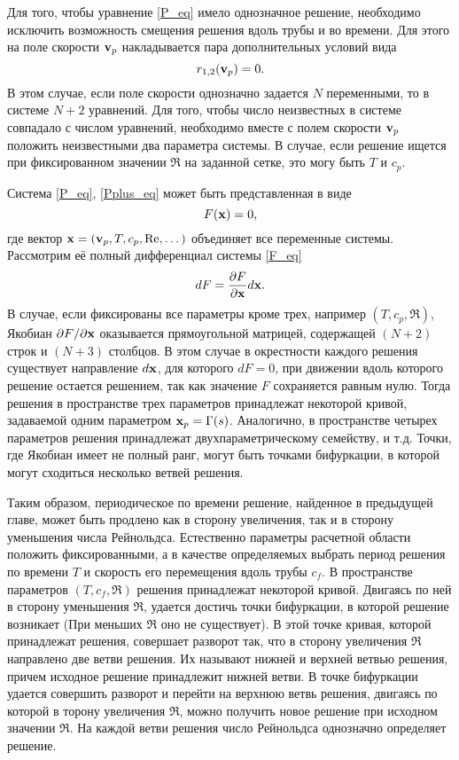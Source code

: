 Для того, чтобы уравнение \eqref{P_eq} имело однозначное решение, необходимо исключить возможность смещения решения вдоль трубы и во времени. Для этого на поле скорости $\mathbf{v}_p$ накладывается пара дополнительных условий вида 
\begin{equation}\label{Pplus_eq}
r_{1,2}(\mathbf{v}_p) = 0.
\end{equation}
В этом случае, если поле скорости однозначно задается $N$ переменными, то в системе $N+2$ уравнений. Для того, чтобы число неизвестных в системе совпадало с числом уравнений, необходимо вместе с полем скорости $\mathbf{v}_p$ положить неизвестными два параметра системы. В случае, если решение ищется при фиксированном значении $\Re$ на заданной сетке, это могу быть $T$ и $c_p$. 

Система \eqref{P_eq}, \eqref{Pplus_eq} может быть представленная в виде 
\begin{equation}\label{F_eq}
F(\mathbf{x}) = 0, 
\end{equation}
где вектор $\mathbf{x} = (\mathbf{v}_p, T, c_p, \operatorname{Re}, \dots)$ объединяет все переменные системы. Рассмотрим её полный дифференциал системы \eqref{F_eq}
\begin{equation}\label{dF_eq}
dF = \frac{\partial F}{\partial \mathbf{x}}d\mathbf{x}.
\end{equation}
В случае, если фиксированы все параметры кроме трех, например $(T, c_p, \Re)$, Якобиан ${\partial F}/{\partial \mathbf{x}}$ оказывается прямоугольной матрицей, содержащей $(N+2)$ строк и $(N+3)$ столбцов. В этом случае в окрестности каждого решения существует направление $d\mathbf{x}$, для которого $dF = 0$, при движении вдоль которого решение остается решением, так как значение $F$ сохраняется равным нулю. Тогда решения в пространстве трех параметров принадлежат некоторой кривой, задаваемой одним параметром $\mathbf{x}_p = \Gamma(s)$. Аналогично, в пространстве четырех параметров решения принадлежат двухпараметрическому семейству, и т.д. Точки, где Якобиан имеет не полный ранг, могут быть точками бифуркации, в которой могут сходиться несколько ветвей решения. 

Таким образом, периодическое по времени решение, найденное в предыдущей главе, может быть продлено как в сторону увеличения, так и в сторону уменьшения числа Рейнольдса. Естественно параметры расчетной области положить фиксированными, а в качестве определяемых выбрать период решения по времени $T$ и скорость его перемещения вдоль трубы $c_f$. В пространстве параметров $(T, c_f, \Re)$ решения принадлежат некоторой кривой. Двигаясь по ней в сторону уменьшения $\Re$, удается достичь точки бифуркации, в которой решение возникает (При меньших $\Re$ оно не существует). В этой точке кривая, которой принадлежат решения, совершает разворот так, что в сторону увеличения $\Re$ направлено две ветви решения. Их называют нижней и верхней ветвью решения, причем исходное решение принадлежит нижней ветви. В точке бифуркации удается совершить разворот и перейти на верхнюю ветвь решения, двигаясь по которой в торону увеличения $\Re$, можно получить новое решение при исходном значении $\Re$. На каждой ветви решения число Рейнольдса однозначно определяет решение. 

